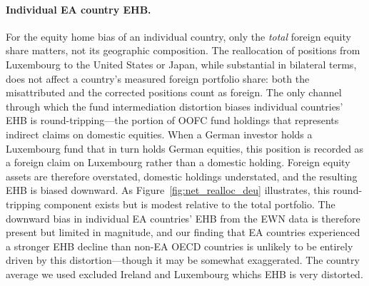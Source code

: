 \documentclass{article}
\begin{document}
\paragraph{Individual EA country EHB.} For the equity home bias of an 
individual country, only the \textit{total} foreign equity share matters, 
not its geographic composition. The reallocation of positions from 
Luxembourg to the United States or Japan, while substantial in bilateral 
terms, does not affect a country's measured foreign portfolio share: both 
the misattributed and the corrected positions count as foreign. The only 
channel through which the fund intermediation distortion biases individual 
countries' EHB is round-tripping---the portion of OOFC fund holdings 
that represents indirect claims on domestic equities. When a German 
investor holds a Luxembourg fund that in turn holds German equities, 
this position is recorded as a foreign claim on Luxembourg rather than 
a domestic holding. Foreign equity assets are therefore overstated, 
domestic holdings understated, and the resulting EHB is biased downward. 
As Figure~\ref{fig:net_realloc_deu} illustrates, this round-tripping 
component exists but is modest relative to the total portfolio. The 
downward bias in individual EA countries' EHB from the EWN data is 
therefore present but limited in magnitude, and our finding that EA 
countries experienced a stronger EHB decline than non-EA OECD countries 
is unlikely to be entirely driven by this distortion---though it may 
be somewhat exaggerated.
The country average we used excluded Ireland and Luxembourg whichs EHB is very distorted.
\end{document}
